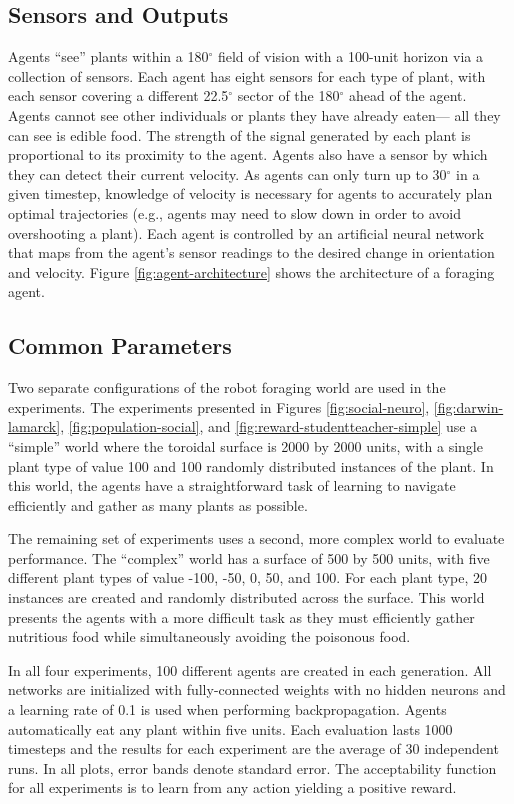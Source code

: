 \documentclass{sig-alternate}
\begin{document}
\subsection{Sensors and Outputs}

Agents ``see'' plants within a 180$^\circ$ field of vision with a 100-unit horizon via a collection of sensors. Each agent has eight sensors for each type of plant, with each sensor covering a different 22.5$^\circ$ sector of the 180$^\circ$ ahead of the agent. Agents cannot see other individuals or plants they have already eaten--- all they can see is edible food. The strength of the signal generated by each plant is proportional to its proximity to the agent. Agents also have a sensor by which they can detect their current velocity. As agents can only turn up to 30$^\circ$ in a given timestep, knowledge of velocity is necessary for agents to accurately plan optimal trajectories (e.g., agents may need to slow down in order to avoid overshooting a plant).  Each agent is controlled by an artificial neural network that maps from the agent's sensor readings to the desired change in orientation and velocity. Figure \ref{fig:agent-architecture} shows the architecture of a foraging agent.

\subsection{Common Parameters}

Two separate configurations of the robot foraging world are used in the experiments. The experiments presented in Figures \ref{fig:social-neuro}, \ref{fig:darwin-lamarck}, \ref{fig:population-social}, and \ref{fig:reward-studentteacher-simple} use a ``simple'' world where the toroidal surface is 2000 by 2000 units, with a single plant type of value 100 and 100 randomly distributed instances of the plant. In this world, the agents have a straightforward task of learning to navigate efficiently and gather as many plants as possible.

The remaining set of experiments uses a second, more complex world to evaluate performance. The ``complex'' world has a surface of 500 by 500 units, with five different plant types of value -100, -50, 0, 50, and 100. For each plant type, 20 instances are created and randomly distributed across the surface. This world presents the agents with a more difficult task as they must efficiently gather nutritious food while simultaneously avoiding the poisonous food.

In all four experiments, 100 different agents are created in each generation. All networks are initialized with fully-connected weights with no hidden neurons and a learning rate of 0.1 is used when performing backpropagation. Agents automatically eat any plant within five units. Each evaluation lasts 1000 timesteps and the results for each experiment are the average of 30 independent runs. In all plots, error bands denote standard error. The acceptability function for all experiments is to learn from any action yielding a positive reward.
\end{document}
